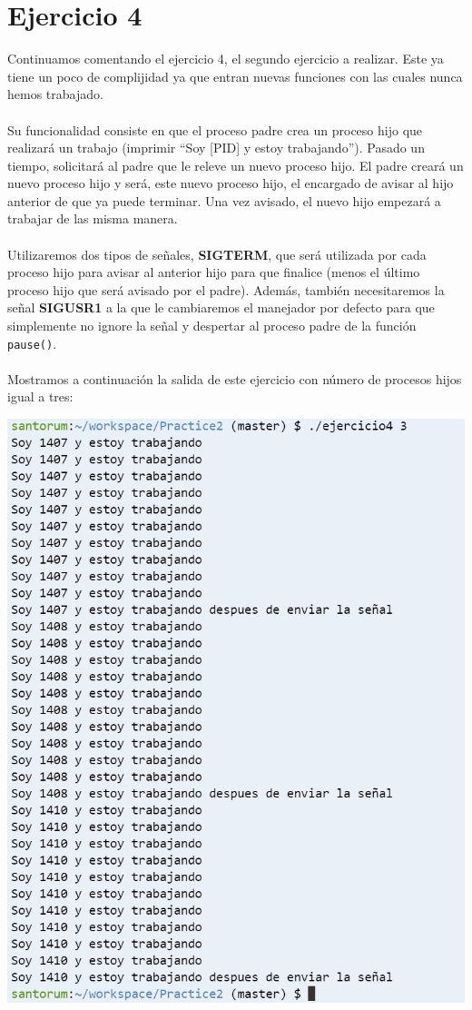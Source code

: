\documentclass[12pt]{article}
\begin{document}
\section{Ejercicio 4}
Continuamos comentando el ejercicio 4, el segundo ejercicio a realizar. Este ya tiene un poco de complijidad ya que entran nuevas funciones con las cuales nunca hemos trabajado.\\\\
Su funcionalidad consiste en que el proceso padre crea un proceso hijo que realizará un trabajo (imprimir “Soy [PID] y estoy trabajando”). Pasado un tiempo, solicitará al padre que le releve un nuevo proceso hijo. El padre creará un nuevo proceso hijo y será, este nuevo proceso hijo, el encargado de avisar al hijo anterior de que ya puede terminar. Una vez avisado, el nuevo hijo empezará a trabajar de las misma manera.\\\\
Utilizaremos dos tipos de señales, \textbf{SIGTERM}, que será utilizada por cada proceso hijo para avisar al anterior hijo para que finalice (menos el último proceso hijo que será avisado por el padre). Además, también necesitaremos la señal \textbf{SIGUSR1} a la que le cambiaremos el manejador por defecto para que simplemente no ignore la señal y despertar al proceso padre de la función \texttt{pause()}.\\\\
Mostramos a continuación la salida de este ejercicio con número de procesos hijos igual a tres:
\begin{center}
	\includegraphics[scale=0.9]{ej4.PNG}
\end{center}
\end{document}
